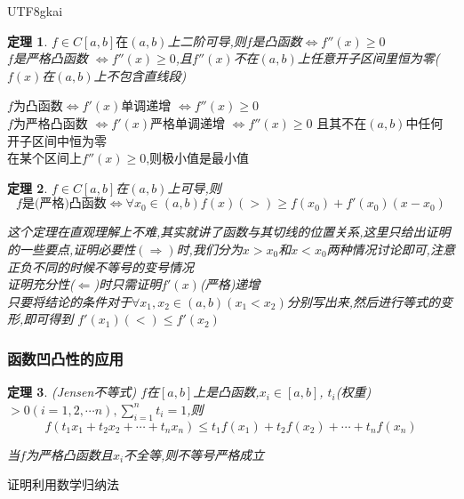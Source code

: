 \documentclass{article}
\newtheorem{theorem}{定理}[subsection]
\newenvironment{cproof}{%
\heiti{证明}\kaishu
}{%
}
\begin{document}
\begin{CJK}{UTF8}{gkai}
\begin{cproof}
\end{cproof}

\begin{theorem}
$f\in C[a,b]在(a,b)$上二阶可导,则$f$是凸函数$\Leftrightarrow f''(x) \geq 0$\\
$f$是严格凸函数 $\Leftrightarrow f''(x) \geq 0$,且$f''(x)$不在$(a,b)$上任意开子区间里恒为零($f(x)$在$(a,b)$上不包含直线段)
\end{theorem}
\begin{cproof}
$f$为凸函数$\Leftrightarrow f'(x)$单调递增 $\Leftrightarrow f''(x) \geq 0$\\

$f$为严格凸函数 $\Leftrightarrow f'(x)$严格单调递增 $\Leftrightarrow f''(x) \geq 0$ 且其不在$(a,b)$中任何开子区间中恒为零\\
\end{cproof}
在某个区间上$f''(x)\geq 0$,则极小值是最小值\\

\begin{theorem}
$f\in C[a,b]$在$(a,b)$上可导,则\\
\[f\text{是(严格)凸函数}\Leftrightarrow \forall x_0 \in (a,b) f(x) (>)\geq f(x_0) + f'(x_0) (x-x_0)\]

这个定理在直观理解上不难,其实就讲了函数与其切线的位置关系,这里只给出证明的一些要点,证明必要性$(\Rightarrow)$时,我们分为$x > x_0$和$x < x_0$两种情况讨论即可,注意正负不同的时候不等号的变号情况\\

证明充分性($\Leftarrow$)时只需证明$f'(x)$(严格)递增\\

只要将结论的条件对于$\forall x_1,x_2\in(a,b)(x_1<x_2)$分别写出来,然后进行等式的变形,即可得到 $f'(x_1) (<)\leq f'(x_2)$\\
\end{theorem}

\subsubsection{函数凹凸性的应用}

\begin{theorem}(Jensen不等式)
$f$在$[a,b]$上是凸函数,$x_i \in [a,b]$, $t_i$(权重) $> 0(i = 1,2,\cdots n) ,\sum_{i = 1} ^{n} t_i = 1$,则\\
\[f(t_1 x_1 + t_2 x_2 + \cdots + t_n x_n) \leq t_1f(x_1) + t_2 f(x_2) + \cdots + t_n f(x_n)\]

当$f$为严格凸函数且$x_i$不全等,则不等号严格成立\\
\end{theorem}
\begin{cproof}
证明利用数学归纳法


\end{cproof}
\end{CJK}
\end{document}
